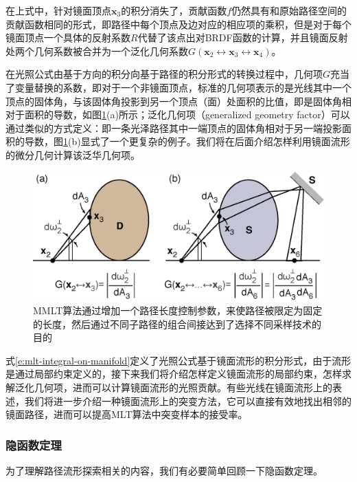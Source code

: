 \noindent 在上式中，针对镜面顶点$\mathbf{x}_3$的积分消失了，贡献函数$f$仍然具有和原始路径空间的贡献函数相同的形式，即路径中每个顶点及边对应的相应项的乘积，但是对于每个镜面顶点一个具体的反射系数$R$代替了该点出对BRDF函数的计算，并且镜面反射处两个几何系数被合并为一个泛化几何系数$G(\mathbf{x}_2\leftrightarrow\mathbf{x}_3\leftrightarrow\mathbf{x}_4)$。

在光照公式由基于方向的积分向基于路径的积分形式的转换过程中，几何项$G$充当了变量替换的系数，即对于一个非镜面顶点，标准的几何项表示的是光线其中一个顶点的固体角，与该固体角投影到另一个顶点（面）处面积的比值，即是固体角相对于面积的导数，如图\ref{f:mlt-generalized-geometry-factor}(a)所示；泛化几何项（generalized geometry factor）可以通过类似的方式定义：即一条光泽路径其中一端顶点的固体角相对于另一端投影面积的导数，图\ref{f:mlt-generalized-geometry-factor}(b)显式了一个更复杂的例子。我们将在后面介绍怎样利用镜面流形的微分几何计算该泛华几何项。

\begin{figure}
\sidecaption
	\includegraphics[width=.65\textwidth]{figures/mlt/generalized-geometry-factor}
	\caption{MMLT算法通过增加一个路径长度控制参数，来使路径被限定为固定的长度，然后通过不同子路径的组合间接达到了选择不同采样技术的目的}
	\label{f:mlt-generalized-geometry-factor}
\end{figure}

式\ref{e:mlt-integral-on-manifold}定义了光照公式基于镜面流形的积分形式，由于流形是通过局部约束定义的，接下来我们将介绍怎样定义镜面流形的局部约束，怎样求解泛化几何项，进而可以计算镜面流形的光照贡献。有些光线在镜面流形上的表述，我们将进一步介绍一种镜面流形上的突变方法，它可以直接有效地找出相邻的镜面路径，进而可以提高MLT算法中突变样本的接受率。




\subsubsection{隐函数定理}\label{sec:mlt-implicit-function-throrem}
为了理解路径流形探索相关的内容，我们有必要简单回顾一下隐函数定理。

